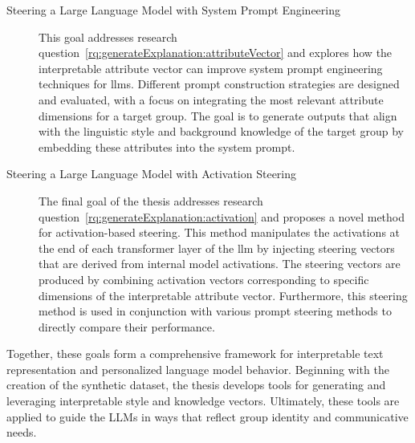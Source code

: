 \begin{description}
  \item[Steering a Large Language Model with System Prompt Engineering]\hspace{\maxstretch}
        This goal addresses research question~\ref{rq:generateExplanation:attributeVector} and explores how the interpretable attribute vector can improve system prompt engineering techniques for \acp{llm}. Different prompt construction strategies are designed and evaluated, with a focus on integrating the most relevant attribute dimensions for a target group. The goal is to generate outputs that align with the linguistic style and background knowledge of the target group by embedding these attributes into the system prompt.

  \item[Steering a Large Language Model with Activation Steering]\hphantom{i}
        The final goal of the thesis addresses research question~\ref{rq:generateExplanation:activation} and proposes a novel method for activation-based steering. This method manipulates the activations at the end of each transformer layer of the \ac{llm} by injecting steering vectors that are derived from internal model activations. The steering vectors are produced by combining activation vectors corresponding to specific dimensions of the interpretable attribute vector. Furthermore, this steering method is used in conjunction with various prompt steering methods to directly compare their performance.
\end{description}

Together, these goals form a comprehensive framework for interpretable text representation and personalized language model behavior. Beginning with the creation of the synthetic dataset, the thesis develops tools for generating and leveraging interpretable style and knowledge vectors. Ultimately, these tools are applied to guide the LLMs in ways that reflect group identity and communicative needs.
